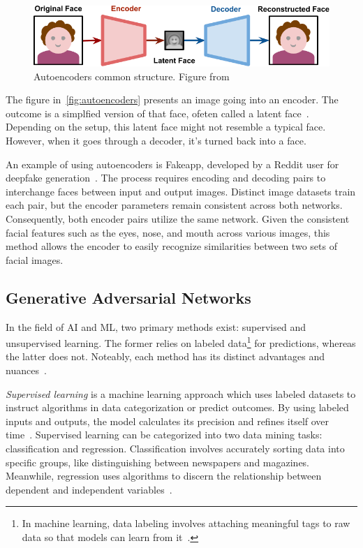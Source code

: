 \begin{figure}[ht]
	\centering
	\includegraphics[scale=0.45]{figures/deepfakes_00d}
	\caption{Autoencoders common structure. Figure from~\cite{autoencoders-image-alazucconi}}\label{fig:autoencoders}
\end{figure}

The figure in~\autoref{fig:autoencoders} presents an image going
into an encoder. The outcome is a simplfied version of that face, ofeten called a latent face~\cite{autoencoders-image-alazucconi}.
Depending on the setup, this latent face might not resemble a typical face. However, when it goes
through a decoder, it's turned back into a face.

An example of using autoencoders is Fakeapp, developed by a Reddit user for deepfake generation~\cite{s22124556,fakeapp-app}.
The process requires encoding and decoding pairs to interchange faces between input and
output images. Distinct image datasets train each pair, but the encoder parameters remain
consistent across both networks. Consequently, both encoder pairs utilize the same network. Given
the consistent facial features such as the eyes, nose, and mouth across various images,
this method allows the encoder to easily recognize similarities between two sets of facial images.

\subsection{Generative Adversarial Networks}
In the field of \ac{AI} and \ac{ML}, two primary methods exist: supervised and unsupervised learning.
The former relies on labeled data\footnote{In machine learning, data labeling involves attaching
	meaningful tags to raw data so that models can learn from it~\cite{labeled-data}.}
for predictions, whereas the latter does not. Noteably, each method has its distinct advantages and
nuances~\cite{ibm-machine-learning}.

\textit{Supervised learning} is a machine learning approach which uses labeled datasets to
instruct algorithms in data categorization or predict outcomes. By using labeled inputs and outputs,
the model calculates its precision and refines itself over time~\cite{supervised-unsupervised}.
Supervised learning can be categorized into two data mining tasks: classification and regression.
Classification involves accurately sorting data into specific groups, like distinguishing between
newspapers and magazines. Meanwhile, regression uses algorithms to discern the relationship between
dependent and independent variables~\cite{ibm-machine-learning}.

